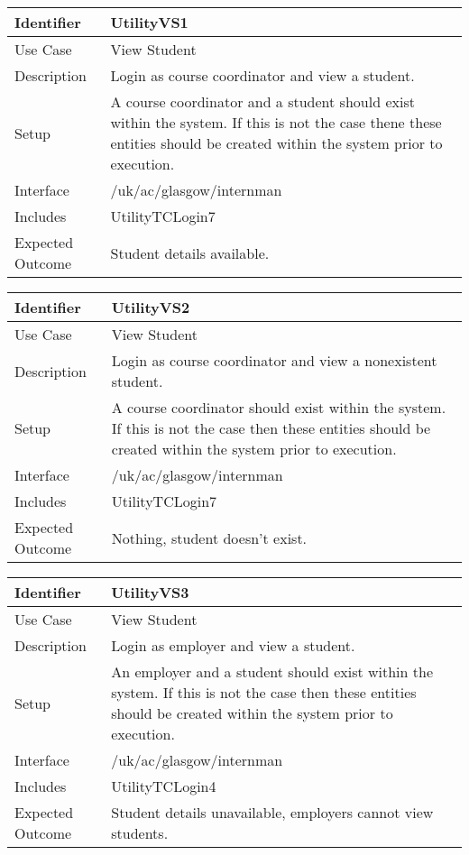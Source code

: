 \begin{tabularx}{\textwidth}{|T|L|}
\hline
Identifier & UtilityVS1\\
\hline
Use Case & View Student \\
\hline
Description & Login as course coordinator and view a student.\\
\hline
Setup & A course coordinator and a student should exist within the
system. If this is not the case thene these entities should be created
within the system prior to execution.\\
\hline
Interface & /uk/ac/glasgow/internman \\
\hline
Includes & UtilityTCLogin7\\
\hline
Expected Outcome & Student details available.\\
\hline
\end{tabularx}

\vspace{2em}

\begin{tabularx}{\textwidth}{|T|L|}
\hline
Identifier & UtilityVS2\\
\hline
Use Case & View Student \\
\hline
Description & Login as course coordinator and view a nonexistent student.\\
\hline
Setup & A course coordinator should exist within the system. If this
is not the case then these entities should be created within the system
prior to execution.\\
\hline
Interface & /uk/ac/glasgow/internman \\
\hline
Includes & UtilityTCLogin7\\
\hline
Expected Outcome & Nothing, student doesn't exist.\\
\hline
\end{tabularx}

\vspace{2em}

\begin{tabularx}{\textwidth}{|T|L|}
\hline
Identifier & UtilityVS3\\
\hline
Use Case & View Student \\
\hline
Description & Login as employer and view a student.\\
\hline
Setup & An employer and a student should exist within the system. If
this is not the case then these entities should be created within the
system prior to execution. \\
\hline
Interface & /uk/ac/glasgow/internman \\
\hline
Includes & UtilityTCLogin4\\
\hline
Expected Outcome & Student details unavailable, employers cannot view
students.\\
\hline
\end{tabularx}

